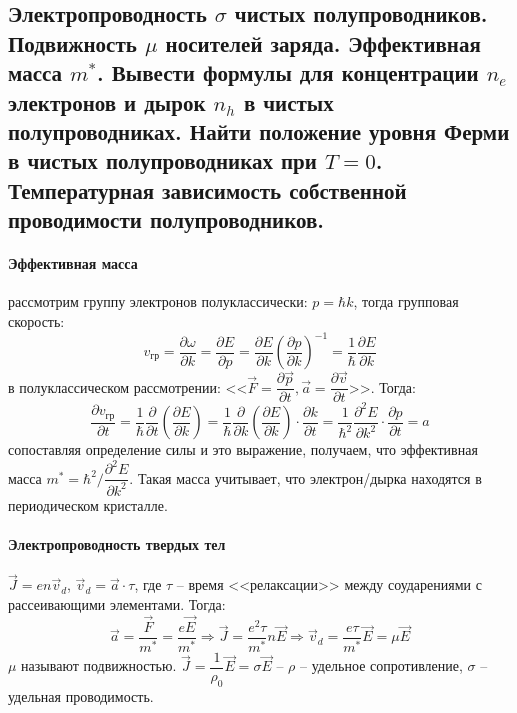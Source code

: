 \subsection{Электропроводность $\sigma$ чистых полупроводников. Подвижность $\mu$ носителей заряда.
Эффективная масса $m^*$. Вывести формулы для концентрации $n_e$ электронов и дырок $n_h$
в чистых полупроводниках. Найти положение уровня Ферми в чистых полупроводниках при $T=0$.
Температурная зависимость собственной проводимости полупроводников.}

\paragraph{Эффективная масса} рассмотрим группу электронов полуклассически: $p = \hbar k$, тогда
групповая скорость:
\[
  v_\text{гр} = \dfrac{\partial \omega}{\partial k} = \dfrac{\partial E}{\partial p} 
  = \dfrac{\partial E}{\partial k} \left( \dfrac{\partial p}{\partial k}  \right)^{-1}
  = \dfrac{1}{\hbar} \dfrac{\partial E}{\partial k} 
\]
в полуклассическом рассмотрении: <<$\vec{F} = \dfrac{\partial \vec{p}}{\partial t},
\vec{a} = \dfrac{\partial \vec{v}}{\partial t}$>>. Тогда:
\[
  \dfrac{\partial v_\text{гр}}{\partial t}
  = \dfrac{1}{\hbar} \dfrac{\partial }{\partial t} \left( \dfrac{\partial E}{\partial k} \right)
  = \dfrac{1}{\hbar} \dfrac{\partial }{\partial k} \left( \dfrac{\partial E}{\partial k}  \right) \cdot \dfrac{\partial k}{\partial t} 
  = \dfrac{1}{\hbar^2} \dfrac{\partial^2 E}{\partial k^2} \cdot \dfrac{\partial p}{\partial t}
  = a 
\]
сопоставляя определение силы и это выражение, получаем, что эффективная масса $m^* = \hbar^2 / \dfrac{\partial^2 E}{\partial k^2}$. Такая масса учитывает, что электрон/дырка
находятся в периодическом кристалле.

\paragraph{Электропроводность твердых тел} $\vec{J} = en \vec{v}_d$, $\vec{v}_d = \vec{a} \cdot \tau$, где $\tau$ -- время <<релаксации>> между соударениями с рассеивающими элементами. Тогда:
\begin{equation}\label{write:10:v_d}
  \vec{a} = \dfrac{\vec{F}}{m^*} = \dfrac{e\vec{E}}{m^*}
  \Rightarrow
  \vec{J} = \dfrac{e^2 \tau}{m^*} n \vec{E}
  \Rightarrow
  \vec{v}_d = \dfrac{e \tau}{m^*} \vec{E} = \mu \vec{E}
\end{equation}
$\mu$ называют подвижностью. $\vec{J} = \dfrac{1}{\rho_0} \vec{E} = \sigma \vec{E}$ -- $\rho$ --
удельное сопротивление, $\sigma$ -- удельная проводимость.

